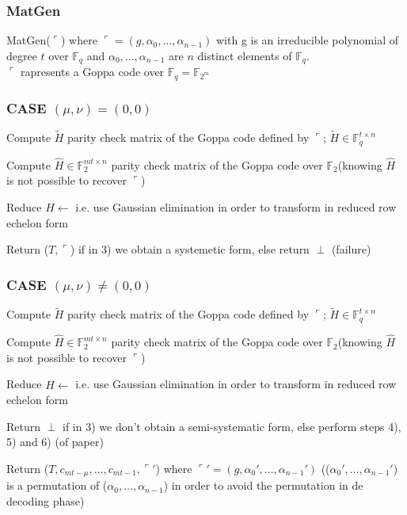 \subsubsection{MatGen}
MatGen($\ulcorner$) where $\ulcorner = (g, \alpha_0, \ldots, \alpha_{n-1})$ with g is an irreducible polynomial of degree $t$ over $\mathbb{F}_q$ and $\alpha_0, \ldots, \alpha_{n-1}$ are $n$ distinct elements of $\mathbb{F}_q$.\\
$\ulcorner$ rapresents a Goppa code over $\mathbb{F}_q = \mathbb{F}_{2^m}$

\subsubsection*{CASE $(\mu, \nu) = (0, 0)$}

\begin{algorithm}
\begin{algorithmic}[1]

    \State Compute $\tilde{H}$ parity check matrix of the Goppa code defined by $\ulcorner$; $\tilde{H} \in \mathbb{F}_q^{t \times n}$

    \State Compute $\hat{H} \in \mathbb{F}_2^{mt \times n}$ parity check matrix of the Goppa code over $\mathbb{F}_2$(knowing $\hat{H}$ is not possible to recover $\ulcorner$)

    \State Reduce $\hat{H}\leftarrow$ i.e. use Gaussian elimination in order to transform in reduced row echelon form

    \State Return ($T, \ulcorner$) if in 3) we obtain a systemetic form, else return $\perp$ (failure)
    \end{algorithmic}
    \end{algorithm}

\newpage
\subsubsection*{CASE $(\mu, \nu) \neq (0, 0)$}

\begin{algorithm}
\begin{algorithmic}[1]

    \State Compute $\tilde{H}$ parity check matrix of the Goppa code defined by $\ulcorner$; $\tilde{H} \in \mathbb{F}_q^{t \times n}$

    \State Compute $\hat{H} \in \mathbb{F}_2^{mt \times n}$ parity check matrix of the Goppa code over $\mathbb{F}_2$(knowing $\hat{H}$ is not possible to recover $\ulcorner$)

    \State Reduce $\hat{H}\leftarrow$ i.e. use Gaussian elimination in order to transform in reduced row echelon form

    \State Return $\perp$ if in 3) we don't obtain a semi-systematic form, else perform steps 4), 5) and 6) (of paper)

    \State Return ($T, c_{mt-\mu}, \ldots, c_{mt-1}, \ulcorner'$) where $\ulcorner' = (g, \alpha_0', \ldots, \alpha_{n-1}')$ (($\alpha_0', \ldots, \alpha_{n-1}'$) is a permutation of ($\alpha_0, \ldots, \alpha_{n-1}$) in order to avoid the permutation in de decoding phase)

\end{algorithmic}
\end{algorithm}

